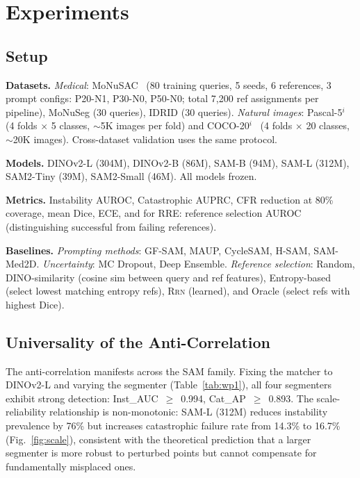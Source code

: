 \documentclass[10pt,twocolumn,letterpaper]{article}
\newcommand{\RRN}{\textsc{Rrn}}
\begin{document}
\section{Experiments}

\subsection{Setup}

\textbf{Datasets.} \textit{Medical}: MoNuSAC~\cite{verma2021monusac} (80
training queries, 5 seeds, 6 references, 3 prompt configs: P20-N1, P30-N0,
P50-N0; total 7,200 ref assignments per pipeline), MoNuSeg (30 queries),
IDRID (30 queries). \textit{Natural images}: Pascal-5$^i$~\cite{shaban2017one}
(4 folds $\times$ 5 classes, $\sim$5K images per fold) and
COCO-20$^i$~\cite{nguyen2019feature} (4 folds $\times$ 20 classes, $\sim$20K
images). Cross-dataset validation uses the same protocol.

\textbf{Models.} DINOv2-L (304M), DINOv2-B (86M), SAM-B (94M), SAM-L (312M),
SAM2-Tiny (39M), SAM2-Small (46M). All models frozen.

\textbf{Metrics.} Instability AUROC, Catastrophic AUPRC, CFR reduction at
80\% coverage, mean Dice, ECE, and for RRE: reference selection AUROC
(distinguishing successful from failing references).

\textbf{Baselines.} \textit{Prompting methods}: GF-SAM, MAUP, CycleSAM,
H-SAM, SAM-Med2D. \textit{Uncertainty}: MC Dropout,
Deep Ensemble. \textit{Reference selection}: Random, DINO-similarity
(cosine sim between query and ref features), Entropy-based (select lowest matching entropy refs),
\RRN{} (learned), and Oracle (select refs with highest Dice).

\subsection{Universality of the Anti-Correlation}

The anti-correlation manifests across the SAM family. Fixing the matcher to
DINOv2-L and varying the segmenter (Table~\ref{tab:wp1}), all four
segmenters exhibit strong detection: Inst\_AUC~$\geq$~0.994, Cat\_AP~$\geq$~0.893.
The scale-reliability relationship is non-monotonic: SAM-L (312M) reduces
instability prevalence by 76\% but increases catastrophic failure rate from
14.3\% to 16.7\% (Fig.~\ref{fig:scale}), consistent with the theoretical
prediction that a larger segmenter is more robust to perturbed points but
cannot compensate for fundamentally misplaced ones.
\end{document}
